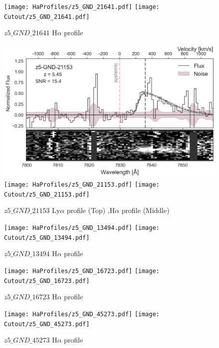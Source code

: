 \documentclass[12pt,english]{article}
\begin{document}
\clearpage
\begin{figure}
\begin{center}\texttt{[image: HaProfiles/z5\_GND\_21641.pdf]}
\texttt{[image: Cutout/z5\_GND\_21641.pdf]}
\caption{$z5\_GND\_21641$ H$\alpha$ profile}
\end{center}
\end{figure}
\clearpage
\begin{figure}
\begin{center}\includegraphics[width=12cm, trim=0.1cm 0cm 0cm -1cm]{LyaProfiles/z5_GND_21153.png}
\texttt{[image: HaProfiles/z5\_GND\_21153.pdf]}
\texttt{[image: Cutout/z5\_GND\_21153.pdf]}
\caption{$z5\_GND\_21153$ Ly$\alpha$ profile (Top) ,H$\alpha$ profile (Middle)}
\end{center}
\end{figure}
\clearpage
\begin{figure}
\begin{center}\texttt{[image: HaProfiles/z5\_GND\_13494.pdf]}
\texttt{[image: Cutout/z5\_GND\_13494.pdf]}
\caption{$z5\_GND\_13494$ H$\alpha$ profile}
\end{center}
\end{figure}
\clearpage
\begin{figure}
\begin{center}\texttt{[image: HaProfiles/z5\_GND\_16723.pdf]}
\texttt{[image: Cutout/z5\_GND\_16723.pdf]}
\caption{$z5\_GND\_16723$ H$\alpha$ profile}
\end{center}
\end{figure}
\clearpage
\begin{figure}
\begin{center}\texttt{[image: HaProfiles/z5\_GND\_45273.pdf]}
\texttt{[image: Cutout/z5\_GND\_45273.pdf]}
\caption{$z5\_GND\_45273$ H$\alpha$ profile}
\end{center}
\end{figure}
\end{document}
